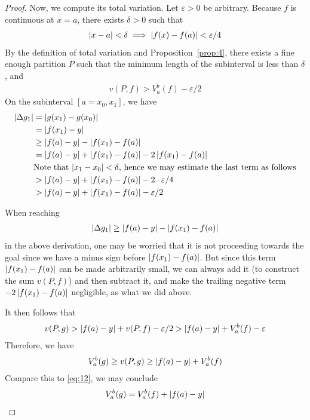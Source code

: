 \documentclass[thmcnt=section, color=blue, 12pt]{my-elegantbook}
\begin{document}
\begin{proof}
	Now, we compute its total variation.
	Let $\varepsilon > 0$ be arbitrary.
	Because $f$ is continuous at $x=a$,
	there exists $\delta > 0$ such that
	\begin{align*}
		\left\lvert x - a \right\rvert < \delta \implies \left\lvert f(x) - f(a) \right\rvert < \varepsilon/4
	\end{align*}
	By the definition of total variation and Proposition~\ref{prop:4},
	there exists a fine enough partition $P$
	such that the minimum length of the subinterval is less than $\delta$, and
	\begin{align*}
		v(P, f) > V_a^b(f) - \varepsilon/2
	\end{align*}
	On the subinterval $[a=x_0, x_1]$, we have
	\begin{align*}
		\left\lvert \Delta g_1 \right\rvert & = \left\lvert g(x_1) - g(x_0) \right\rvert                                                                     \\
		                 & = \left\lvert f(x_1) - y \right\rvert                                                                          \\
		                 & \geq \left\lvert f(a) - y \right\rvert - \left\lvert f(x_1) - f(a) \right\rvert                                                   \\
		                 & = \left\lvert f(a) - y \right\rvert + \left\lvert f(x_1) - f(a) \right\rvert -
		2\left\lvert f(x_1) - f(a) \right\rvert                                                                                           \\
		                 & \text{Note that $\left\lvert x_1 - x_0 \right\rvert < \delta$, hence we may estimate the last term as follows} \\
		                 & > \left\lvert f(a) - y \right\rvert + \left\lvert f(x_1) - f(a) \right\rvert - 2 \cdot \varepsilon/4                              \\
		                 & > \left\lvert f(a) - y \right\rvert + \left\lvert f(x_1) - f(a) \right\rvert - \varepsilon/2
	\end{align*}
	\begin{note}
		When reaching
		\begin{align*}
			\left\lvert \Delta g_1 \right\rvert \geq \left\lvert f(a) - y \right\rvert - \left\lvert f(x_1) - f(a) \right\rvert
		\end{align*}
		in the above derivation,
		one may be worried that
		it is not proceeding towards the goal
		since we have a minus sign before $\left\lvert f(x_1) - f(a) \right\rvert$.
		But since this term $\left\lvert f(x_1) - f(a) \right\rvert$ can be made arbitrarily small,
		we can always add it (to construct the sum $v(P, f)$)
		and then subtract it,
		and make the trailing negative term $-2\left\lvert f(x_1) - f(a) \right\rvert$ negligible,
		as what we did above.
	\end{note}
	It then follows that
	\begin{align*}
		v(P, g) > \left\lvert f(a) - y \right\rvert + v(P, f) - \varepsilon/2
		> \left\lvert f(a) - y \right\rvert + V_a^b(f) - \varepsilon
	\end{align*}
	Therefore, we have
	\begin{align*}
		V_a^b(g) \geq v(P, g) \geq \left\lvert f(a) - y \right\rvert + V_a^b(f)
	\end{align*}
	Compare this to \eqref{eq:12}, we may conclude
	\begin{align*}
		V_a^b(g) = V_a^b(f) + \left\lvert f(a) - y \right\rvert
	\end{align*}

\end{proof}
\end{document}
